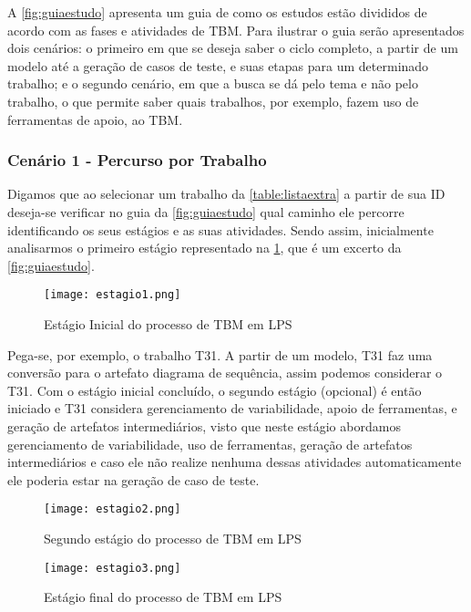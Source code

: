 A \ref{fig:guiaestudo} apresenta um guia de como os estudos estão divididos de acordo com as fases e atividades de TBM. Para ilustrar o guia serão apresentados dois cenários: o primeiro em que se deseja saber o ciclo completo, a partir de um modelo até a geração de casos de teste, e suas etapas para um determinado trabalho; e o segundo cenário, em que a busca se dá pelo tema e não pelo trabalho, o que permite saber quais trabalhos, por exemplo, fazem uso de ferramentas de apoio, ao TBM.

\subsubsection{Cenário 1 - Percurso por Trabalho}

Digamos que ao selecionar um trabalho da \ref{table:listaextra} a partir de sua ID deseja-se verificar no guia da \ref{fig:guiaestudo} qual caminho ele percorre identificando os seus estágios e as suas atividades. Sendo assim, inicialmente analisarmos o primeiro estágio representado na \ref{fig:estagio1}, que é um excerto da \ref{fig:guiaestudo}.

\begin{figure}[htb]
	\centering
	\texttt{[image: estagio1.png]}
	\caption{Estágio Inicial do processo de TBM em LPS}
	\label{fig:estagio1}
\end{figure}
Pega-se, por exemplo, o trabalho T31. A partir de um modelo, T31 faz uma conversão para o artefato diagrama de sequência, assim podemos considerar o T31. Com o estágio inicial concluído, o segundo estágio (opcional) é então iniciado e T31 considera gerenciamento de variabilidade, apoio de ferramentas, e geração de artefatos intermediários, visto que neste estágio abordamos gerenciamento de variabilidade, uso de ferramentas, geração de artefatos intermediários e caso ele não realize nenhuma dessas atividades automaticamente ele poderia estar na geração de caso de teste.


\begin{figure}[htb]
	\centering
	\texttt{[image: estagio2.png]}
	\caption{Segundo estágio do processo de TBM em LPS}
	\label{fig:estagio2}
\end{figure}

\begin{figure}[htb]
	\centering
	\texttt{[image: estagio3.png]}
	\caption{Estágio final do processo de TBM em LPS}
	\label{fig:estagio3}
\end{figure}

